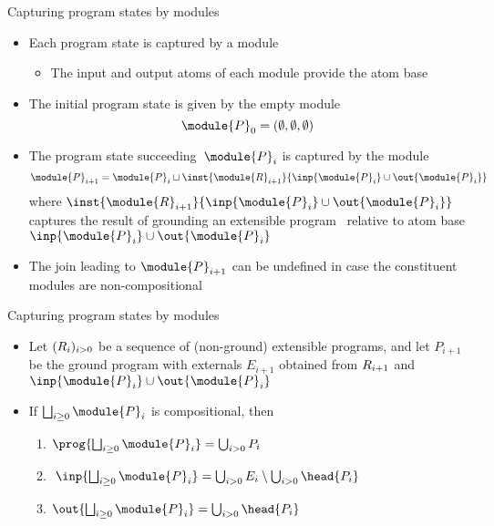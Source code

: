 \begin{frame}{Capturing program states by modules}
  \begin{itemize}
  \item<1-> Each program state is captured by a module
    \begin{itemize}
    \item<2-> The input and output atoms of each module provide the atom base
    \end{itemize}
    \medskip
  \item<3-> The initial program state is given by the empty module
    \[
    \module{P}_0 = (\emptyset,\emptyset,\emptyset)
    \]
  \item<4->
    The program state succeeding~$\module{P}_i$ is captured by the module
    \[ %
      \module{P}_{i+1}
      =
      \module{P}_i
      \sqcup
      \inst{\module{\RRG}_{i+1}}{\inp{\module{P}_i}\cup\out{\module{P}_i}}
    \] %
    where
    \(
    \inst{\module{\RRG}_{i+1}}{\inp{\module{P}_i}\cup\out{\module{P}_i}}
    \)
    captures the result of grounding an extensible program \RRG\ relative to atom base $\inp{\module{P}_i}\cup\out{\module{P}_i}$
    \smallskip
  \item<5->  The join leading to $\module{P}_{i+1}$ can be undefined in case the constituent modules are non-compositional
  \end{itemize}
\end{frame}
\begin{frame}{Capturing program states by modules}
  \begin{itemize}
  \item<1->
Let $(R_i)_{i>0}$ be a sequence of (non-ground) extensible programs,
and let
$P_{i+1}$ be the ground program with externals $E_{i+1}$ obtained from $R_{i+1}$ and $\inp{\module{P}_i}\cup\out{\module{P}_i}$
\bigskip
\item<2->[]
If
\(
\bigsqcup_{i\geq 0}\module{P}_i
\)
is compositional,
then
\medskip
\begin{enumerate}\normalsize
\item
\(
\prog{\bigsqcup_{i\geq 0}\module{P}_i}
=
\bigcup_{i>0} P_i
\)
\smallskip
\item
\(
\;\inp{\bigsqcup_{i\geq 0}\module{P}_i}
=
\bigcup_{i>0} E_i\setminus\bigcup_{i>0} \head{P_i}
\)
\smallskip
\item
\(
\out{\bigsqcup_{i\geq 0}\module{P}_i}
=
\bigcup_{i>0} \head{P_i}
\)
\end{enumerate}
\end{itemize}
\end{frame}
%
